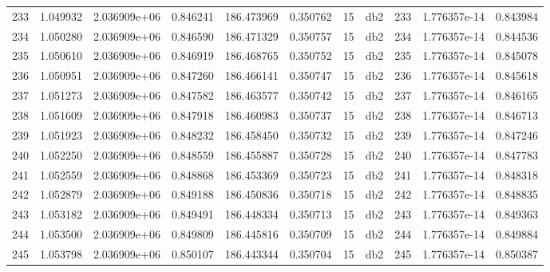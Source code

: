 \begin{tabular}{lrrrrrrlrrr}
233  &    1.049932 &        2.036909e+06 &  0.846241 &              186.473969 &    0.350762 &      15 &          db2 &    233 &   1.776357e-14 &      0.843984 \\
234  &    1.050280 &        2.036909e+06 &  0.846590 &              186.471329 &    0.350757 &      15 &          db2 &    234 &   1.776357e-14 &      0.844536 \\
235  &    1.050610 &        2.036909e+06 &  0.846919 &              186.468765 &    0.350752 &      15 &          db2 &    235 &   1.776357e-14 &      0.845078 \\
236  &    1.050951 &        2.036909e+06 &  0.847260 &              186.466141 &    0.350747 &      15 &          db2 &    236 &   1.776357e-14 &      0.845618 \\
237  &    1.051273 &        2.036909e+06 &  0.847582 &              186.463577 &    0.350742 &      15 &          db2 &    237 &   1.776357e-14 &      0.846165 \\
238  &    1.051609 &        2.036909e+06 &  0.847918 &              186.460983 &    0.350737 &      15 &          db2 &    238 &   1.776357e-14 &      0.846713 \\
239  &    1.051923 &        2.036909e+06 &  0.848232 &              186.458450 &    0.350732 &      15 &          db2 &    239 &   1.776357e-14 &      0.847246 \\
240  &    1.052250 &        2.036909e+06 &  0.848559 &              186.455887 &    0.350728 &      15 &          db2 &    240 &   1.776357e-14 &      0.847783 \\
241  &    1.052559 &        2.036909e+06 &  0.848868 &              186.453369 &    0.350723 &      15 &          db2 &    241 &   1.776357e-14 &      0.848318 \\
242  &    1.052879 &        2.036909e+06 &  0.849188 &              186.450836 &    0.350718 &      15 &          db2 &    242 &   1.776357e-14 &      0.848835 \\
243  &    1.053182 &        2.036909e+06 &  0.849491 &              186.448334 &    0.350713 &      15 &          db2 &    243 &   1.776357e-14 &      0.849363 \\
244  &    1.053500 &        2.036909e+06 &  0.849809 &              186.445816 &    0.350709 &      15 &          db2 &    244 &   1.776357e-14 &      0.849884 \\
245  &    1.053798 &        2.036909e+06 &  0.850107 &              186.443344 &    0.350704 &      15 &          db2 &    245 &   1.776357e-14 &      0.850387 \\

\end{tabular}
